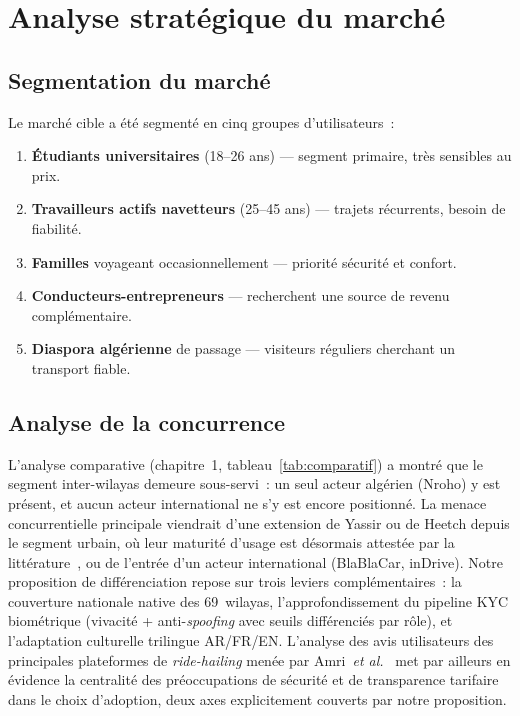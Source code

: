 \section{Analyse stratégique du marché}

\subsection{Segmentation du marché}

Le marché cible a été segmenté en cinq groupes d'utilisateurs~:
\begin{enumerate}
  \item \textbf{Étudiants universitaires} (18--26 ans) --- segment primaire, très sensibles au prix.
  \item \textbf{Travailleurs actifs navetteurs} (25--45 ans) --- trajets récurrents, besoin de fiabilité.
  \item \textbf{Familles} voyageant occasionnellement --- priorité sécurité et confort.
  \item \textbf{Conducteurs-entrepreneurs} --- recherchent une source de revenu complémentaire.
  \item \textbf{Diaspora algérienne} de passage --- visiteurs réguliers cherchant un transport fiable.
\end{enumerate}

\subsection{Analyse de la concurrence}

L'analyse comparative (chapitre~1, tableau~\ref{tab:comparatif}) a montré que le segment inter-wilayas demeure sous-servi~: un seul acteur algérien (Nroho) y est présent, et aucun acteur international ne s'y est encore positionné. La menace concurrentielle principale viendrait d'une extension de Yassir ou de Heetch depuis le segment urbain, où leur maturité d'usage est désormais attestée par la littérature~\cite{naim_yassir_2024}, ou de l'entrée d'un acteur international (BlaBlaCar, inDrive). Notre proposition de différenciation repose sur trois leviers complémentaires~: la couverture nationale native des 69~wilayas, l'approfondissement du pipeline KYC biométrique (vivacité + anti-\textit{spoofing} avec seuils différenciés par rôle), et l'adaptation culturelle trilingue AR/FR/EN. L'analyse des avis utilisateurs des principales plateformes de \textit{ride-hailing} menée par Amri~\textit{et al.}~\cite{amri_ride_hailing_2024} met par ailleurs en évidence la centralité des préoccupations de sécurité et de transparence tarifaire dans le choix d'adoption, deux axes explicitement couverts par notre proposition.


